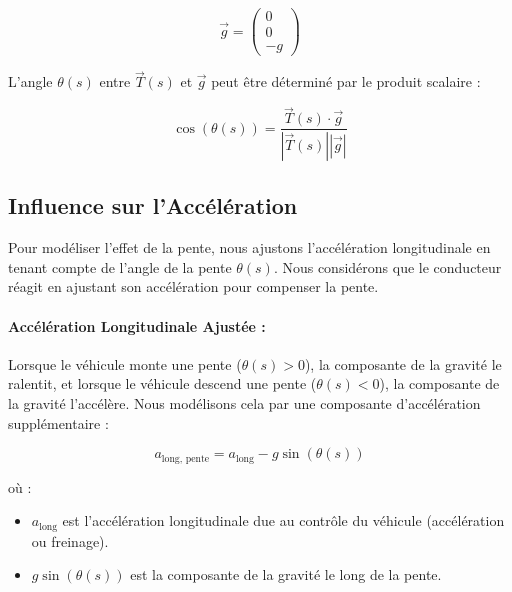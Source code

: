 \documentclass[a4paper,12pt]{article}
\begin{document}
\[
\vec{g} = \begin{pmatrix}
0 \\
0 \\
-g
\end{pmatrix}
\]

L'angle \(\theta(s)\) entre \(\vec{T}(s)\) et \(\vec{g}\) peut être déterminé par le produit scalaire :

\[
\cos(\theta(s)) = \frac{\vec{T}(s) \cdot \vec{g}}{|\vec{T}(s)| |\vec{g}|}
\]

\subsection{Influence sur l'Accélération}

Pour modéliser l'effet de la pente, nous ajustons l'accélération longitudinale en tenant compte de l'angle de la pente \(\theta(s)\). Nous considérons que le conducteur réagit en ajustant son accélération pour compenser la pente.

\paragraph{Accélération Longitudinale Ajustée :}

Lorsque le véhicule monte une pente (\(\theta(s) > 0\)), la composante de la gravité le ralentit, et lorsque le véhicule descend une pente (\(\theta(s) < 0\)), la composante de la gravité l'accélère. Nous modélisons cela par une composante d'accélération supplémentaire :

\[
a_{\text{long, pente}} = a_{\text{long}} - g \sin(\theta(s)) \tag{3}
\]

où :
\begin{itemize}
    \item \(a_{\text{long}}\) est l'accélération longitudinale due au contrôle du véhicule (accélération ou freinage).
    \item \(g \sin(\theta(s))\) est la composante de la gravité le long de la pente.
\end{itemize}
\end{document}
